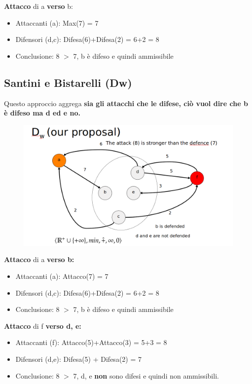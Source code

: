    \textbf{Attacco} di a \textbf{verso} b:
    \begin{itemize}
        \item Attaccanti (a): Max(7) = 7
        \item Difensori (d,c): Difesa(6)+Difesa(2) = 6+2 = 8
        \item Conclusione: 8 $>$ 7, b è difeso e quindi ammissibile
    \end{itemize}

    \subsection{Santini e Bistarelli (Dw)}
    Questo approccio aggrega \textbf{sia gli attacchi che le difese, ciò vuol dire che b è difeso ma d ed e no.}

    \begin{figure}[H]
        \centering
        \includegraphics[width=13cm, keepaspectratio]{img/Cap6/bistarelli2.png}
    \end{figure}

    \textbf{Attacco} di a \textbf{verso b:}

    \begin{itemize}
        \item Attaccanti (a): Attacco(7) = 7
        \item Difensori (d,c): Difesa(6)+Difesa(2) = 6+2 = 8
        \item Conclusione: 8 $>$ 7, b è difeso e quindi ammissibile
    \end{itemize}
    \textbf{Attacco} di f \textbf{verso d, e:}
    \begin{itemize}
        \item Attaccanti (f): Attacco(5)+Attacco(3) = 5+3 = 8
        \item Difensori (d,e): Difesa(5) + Difesa(2) = 7
        \item Conclusione: 8 $>$ 7, d, e \textbf{non} sono difesi e quindi non ammissibili.
    \end{itemize}


